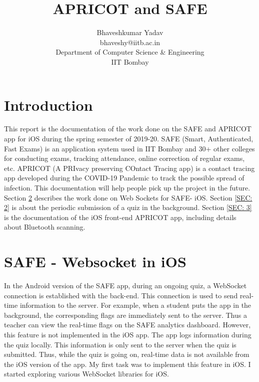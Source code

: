 \documentclass[12pt, conference, a4paper]{article}
\begin{document}
\title{APRICOT and SAFE\\
}
\author{
\begin{tabular}{c}  {Bhaveshkumar Yadav} \\ bhaveshy@iitb.ac.in \\Department of Computer Science \& Engineering \\ IIT Bombay \end{tabular} }

\maketitle
{}



\section{Introduction}
\label{SEC:introduction}
This report is the documentation of the work done on the SAFE and APRICOT app for iOS during the spring semester of 2019-20. SAFE (Smart, Authenticated, Fast Exams) is an application system used in IIT Bombay and 30+ other colleges for conducting exams, tracking attendance, online correction of regular exams, etc. 
APRICOT (A PRIvacy preserving COntact Tracing app) is a contact tracing app developed during the COVID-19 Pandemic to track the possible spread of infection. This documentation will help people pick up the project in the future. 
Section \ref{SEC: 1} describes the work done on Web Sockets for SAFE- iOS. Section \ref{SEC: 2} is about the periodic submission of a quiz in the background. Section \ref{SEC: 3} is the documentation of the iOS front-end APRICOT app, including details about Bluetooth scanning.

\section{SAFE - Websocket in iOS}
\label{SEC: 1}
In the Android version of the SAFE app, during an ongoing quiz, a WebSocket connection is established with the back-end. This connection is used to send real-time information to the server. For example, when a student puts the app in the background, the corresponding flags are immediately sent to the server.
Thus a teacher can view the real-time flags on the SAFE analytics dashboard. 
However, this feature is not implemented in the iOS app. The app logs information during the quiz locally. This information is only sent to the server when the quiz is submitted. Thus, while the quiz is going on, real-time data is not available from the iOS version of the app. 
My first task was to implement this feature in iOS. I started exploring various WebSocket libraries for iOS. 
\end{document}
